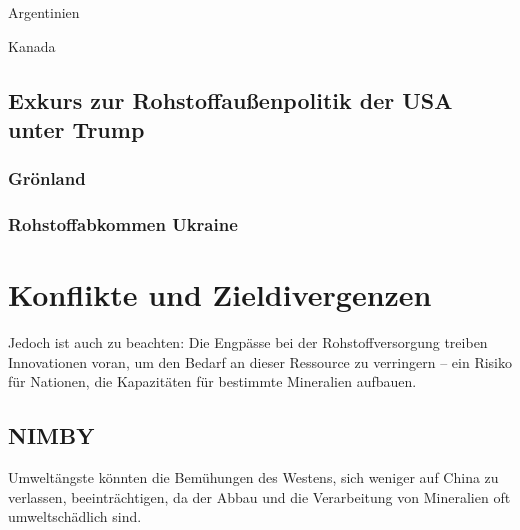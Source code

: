 \documentclass[12pt,a4paper,oneside]{book} %
\begin{document}
Argentinien

Kanada

\subsection{Exkurs zur Rohstoffaußenpolitik der USA unter Trump}

\subsubsection{Grönland}

\subsubsection{Rohstoffabkommen Ukraine}



\section{Konflikte und Zieldivergenzen}

Jedoch ist auch zu beachten: Die Engpässe bei der Rohstoffversorgung treiben Innovationen voran, um den Bedarf an dieser Ressource zu verringern – ein Risiko für Nationen, die Kapazitäten für bestimmte Mineralien aufbauen.

\subsection{NIMBY}

Umweltängste könnten die Bemühungen des Westens, sich weniger auf China zu verlassen, beeinträchtigen, da der Abbau und die Verarbeitung von Mineralien oft umweltschädlich sind.


	
\end{document}
